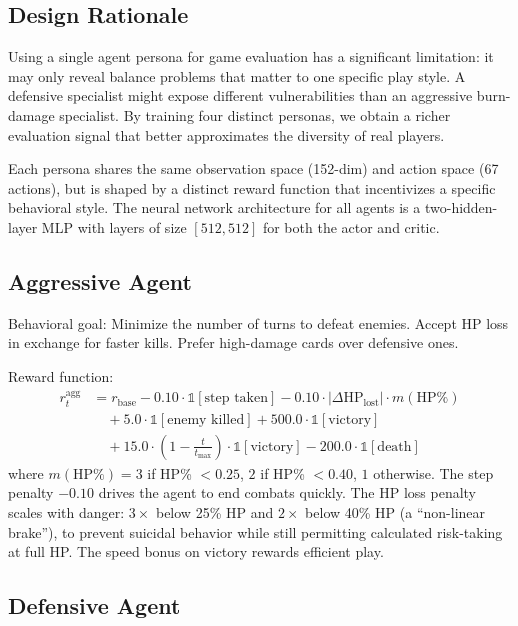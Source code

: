 \subsection{Design Rationale}

Using a single agent persona for game evaluation has a significant limitation: it may only reveal balance problems that matter to one specific play style. A defensive specialist might expose different vulnerabilities than an aggressive burn-damage specialist. By training four distinct personas, we obtain a richer evaluation signal that better approximates the diversity of real players.

Each persona shares the same observation space (152-dim) and action space (67 actions), but is shaped by a distinct reward function that incentivizes a specific behavioral style. The neural network architecture for all agents is a two-hidden-layer MLP with layers of size $[512, 512]$ for both the actor and critic.

\subsection{Aggressive Agent}

Behavioral goal: Minimize the number of turns to defeat enemies. Accept HP loss in exchange for faster kills. Prefer high-damage cards over defensive ones.

Reward function:
\begin{align}
r_t^{\text{agg}} &= r_{\text{base}} - 0.10 \cdot \mathbb{1}[\text{step taken}] - 0.10 \cdot |\Delta\text{HP}_{\text{lost}}| \cdot m(\text{HP}\%) \nonumber \\
&\quad + 5.0 \cdot \mathbb{1}[\text{enemy killed}] + 500.0 \cdot \mathbb{1}[\text{victory}] \nonumber \\
&\quad + 15.0 \cdot \left(1 - \tfrac{t}{t_{\max}}\right) \cdot \mathbb{1}[\text{victory}] - 200.0 \cdot \mathbb{1}[\text{death}]
\end{align}
where $m(\text{HP}\%) = 3$ if HP\% $< 0.25$, $2$ if HP\% $< 0.40$, $1$ otherwise.
The step penalty $-0.10$ drives the agent to end combats quickly. The HP loss penalty scales with danger: $3\times$ below 25\% HP and $2\times$ below 40\% HP (a ``non-linear brake''), to prevent suicidal behavior while still permitting calculated risk-taking at full HP. The speed bonus on victory rewards efficient play.

\subsection{Defensive Agent}

